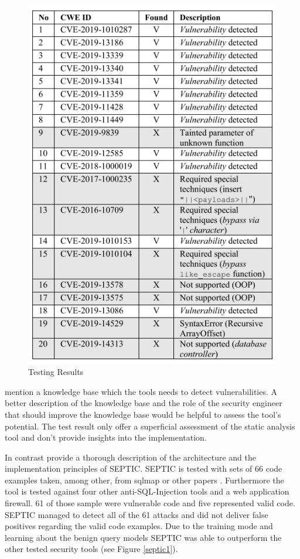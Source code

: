 \begin{figure}[H]
\centering
\includegraphics[scale=0.75]{static_experiment_table.PNG}
\caption{Testing Results \autocite[5]{Maskur2019}}
\end{figure}

\textcite[]{Maskur2019} mention a knowledge base which the tools needs to detect vulnerabilities. A better description of the knowledge base and the role of the security engineer that should improve the knowledge base would be helpful to assess the tool's potential. The test result only offer a superficial assessment of the static analysis tool and don't provide insights into the implementation.\newline  

In contrast \textcite[1170-1180]{Medeiros2019} provide a thorough description of the architecture and the implementation principles of SEPTIC. SEPTIC is tested with sets of 66 code examples taken, among other, from sqlmap \autocite[]{DameleA.G.2014} or other papers \autocite[]{Ray2012, Ray2014}. Furthermore the tool is tested against four other anti-SQL-Injection tools and a web application firewall. 61 of those sample were vulnerable code and five represented valid code. SEPTIC managed to detect all of the 61 attacks and did not deliver false positives regarding the valid code examples. Due to the training mode and learning about the benign query models SEPTIC was able to outperform the other tested security tools (see Figure \ref{septic1}).

